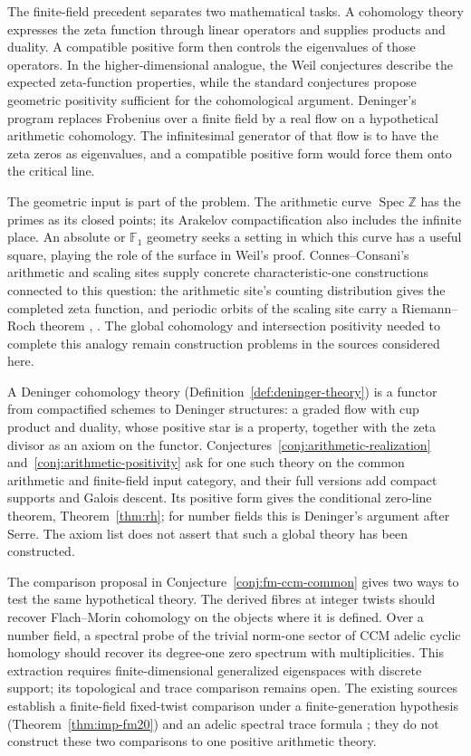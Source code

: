 \documentclass[11pt]{amsart}
\theoremstyle{plain}
\theoremstyle{definition}
\theoremstyle{remark}
\numberwithin{equation}{section}
\newcommand{\Z}{\mathbb{Z}}
\newcommand{\F}{\mathbb{F}}
\DeclareMathOperator{\Spec}{Spec}
\begin{document}
The finite-field precedent separates two mathematical tasks. A
cohomology theory expresses the zeta function through linear operators
and supplies products and duality. A compatible positive form then
controls the eigenvalues of those operators. In the higher-dimensional
analogue, the Weil conjectures describe the expected zeta-function
properties, while the standard conjectures propose geometric
positivity sufficient for the cohomological argument. Deninger's
program replaces Frobenius over a finite field by a real flow on a
hypothetical arithmetic cohomology. The infinitesimal generator of that
flow is to have the zeta zeros as eigenvalues, and a compatible positive
form would force them onto the critical line.

The geometric input is part of the problem. The arithmetic curve
$\Spec\Z$ has the primes as its closed points; its Arakelov
compactification also includes the infinite place. An absolute or
$\F_1$ geometry seeks a setting in which this curve has a useful square,
playing the role of the surface in Weil's proof. Connes--Consani's
arithmetic and scaling sites supply concrete characteristic-one
constructions connected to this question: the arithmetic site's
counting distribution gives the completed zeta function, and periodic
orbits of the scaling site carry a Riemann--Roch theorem
\cite[Theorems~2.6--2.7]{ConnesConsani2014ArithmeticSite},
\cite[Theorem~5.17]{ConnesConsani2017ScalingGeometry}.
The global cohomology and intersection positivity needed to complete
this analogy remain construction problems in the sources considered
here.



A Deninger cohomology theory (Definition~\ref{def:deninger-theory}) is
a functor from compactified schemes to Deninger structures: a graded
flow with cup product and duality, whose positive star is a property,
together with the zeta divisor as an axiom on the functor.
Conjectures~\ref{conj:arithmetic-realization}
and~\ref{conj:arithmetic-positivity} ask for one such theory on the
common arithmetic and finite-field input category, and their full
versions add compact supports and Galois descent.  Its positive form
gives
the conditional zero-line theorem, Theorem~\ref{thm:rh}; for number
fields this is Deninger's argument after Serre.  The axiom list does
not assert that such a global theory has been constructed.

The comparison proposal in Conjecture~\ref{conj:fm-ccm-common} gives
two ways to test the same hypothetical theory.  The derived fibres
at integer twists should recover Flach--Morin cohomology on the
objects where it is defined.  Over a number field, a spectral probe
of the trivial norm-one sector of CCM adelic cyclic homology should
recover its degree-one zero spectrum with multiplicities.  This
extraction requires finite-dimensional generalized eigenspaces
with discrete support; its topological and trace comparison remains
open.  The existing sources establish a finite-field fixed-twist
comparison under a finite-generation hypothesis
(Theorem~\ref{thm:imp-fm20}) and an adelic spectral trace formula
\cite[Theorem~4.16]{ConnesConsaniMarcolli2009Weil}; they do not
construct these two comparisons to one positive arithmetic theory.
\end{document}
